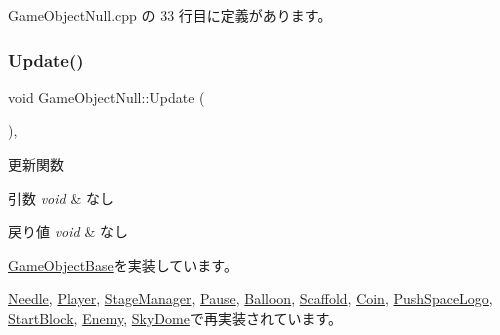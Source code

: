  Game\+Object\+Null.\+cpp の 33 行目に定義があります。

\mbox{\label{class_game_object_null_aeeb51b7e7aa41fd0b16f8f7c016bdb55}} 
\subsubsection{\texorpdfstring{Update()}{Update()}}
{\footnotesize\ttfamily void Game\+Object\+Null\+::\+Update (\begin{DoxyParamCaption}{ }\end{DoxyParamCaption})\hspace{0.3cm}{\ttfamily [override]}, {\ttfamily [virtual]}}



更新関数 


\begin{DoxyParams}{引数}
{\em void} & なし \\
\hline
\end{DoxyParams}

\begin{DoxyRetVals}{戻り値}
{\em void} & なし \\
\hline
\end{DoxyRetVals}


\mbox{\hyperlink{class_game_object_base_a287df113928cd40630fbb1e47a935831}{Game\+Object\+Base}}を実装しています。



\mbox{\hyperlink{class_needle_adf4790c9ad674b809ae576a09a3ee2f2}{Needle}}, \mbox{\hyperlink{class_player_a5e17be3418fa0ac0192c05efaf3dc8bd}{Player}}, \mbox{\hyperlink{class_stage_manager_a254173b565937107fdfe02c0871b3520}{Stage\+Manager}}, \mbox{\hyperlink{class_pause_aeb1d068bcff8e32feea81945e2202141}{Pause}}, \mbox{\hyperlink{class_balloon_ac924b8fb0e2ba4a2a3bae0b7fed6ad13}{Balloon}}, \mbox{\hyperlink{class_scaffold_a0799d380645a9d4e92dfd90f6bb6f9e9}{Scaffold}}, \mbox{\hyperlink{class_coin_a6969409d8c97fc0f51dfe10d5b5072c6}{Coin}}, \mbox{\hyperlink{class_push_space_logo_a2f81cf35e02096bf309146c0bce0b44d}{Push\+Space\+Logo}}, \mbox{\hyperlink{class_start_block_a89fb4c5fafc1d94155c09ba9b22bb94d}{Start\+Block}}, \mbox{\hyperlink{class_enemy_a614ad271f07ecf63cb3e665155b7e258}{Enemy}}, \mbox{\hyperlink{class_sky_dome_ad9b9bfc252cbdc373dfca964430bdb89}{Sky\+Dome}}で再実装されています。



